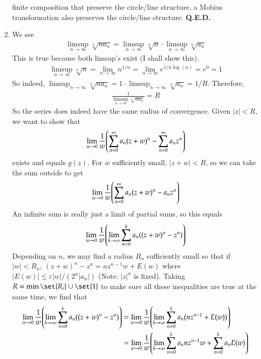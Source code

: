 \documentclass[12pt]{article}
\def \ve{\varepsilon}
\theoremstyle{definition}
\theoremstyle{remark}
\begin{document}
\begin{enumerate}[leftmargin=\labelsep]
finite composition that preserve the circle/line structure, a Mobius transformation also preserves the circle/line structure. \textbf{Q.E.D.}
		
		\item We see
		\begin{align*}
			\limsup_{n \to \infty} \sqrt[n]{na_n} = \limsup_{n \to \infty} \sqrt[n]{n} \cdot \limsup_{n \to \infty} \sqrt[n]{a_n}
		\end{align*}
		This is true because both limsup's exist (I shall show this).
		\begin{align*}
			\limsup_{n \to \infty} \sqrt[n]{n} = \lim_{n \to \infty} n^{1/n} = \lim_{n \to \infty} e^{1/n\log(n)} = e^0 = 1
		\end{align*}
		So indeed, $\limsup_{n \to \infty} \sqrt[n]{na_n} = 1 \cdot \limsup_{n\to\infty} \sqrt[n]{a_n} = 1/R$. Therefore,
		\begin{align*}
			\frac1{\limsup_{n \to \infty} \sqrt[n]{na_n}} = R
		\end{align*}
		So the series does indeed have the same radius of convergence. Given $|z| < R$, we want to show that 
		\begin{align*}
			\lim_{w \to 0} \frac1w \qty(\sum_{n=0}^\infty a_n(z+w)^n - \sum_{n=0}^\infty a_nz^n)
		\end{align*}
		exists and equals $g(z)$. For $w$ sufficiently small, $|z+w| < R$, so we can take the sum outside to get
		\begin{align*}
			\lim_{w \to 0} \frac1w \qty(\sum_{n=0}^\infty a_n(z+w)^n - a_nz^n)
		\end{align*}
		An infinite sum is really just a limit of partial sums, so this equals
		\begin{align*}
			\lim_{w \to 0} \frac1w \qty(\lim_{k \to \infty} \sum_{n=0}^k a_n((z+w)^n - z^n))
		\end{align*}
		Depending on $n$, we may find a radius $R_n$ sufficiently small so that if $|w| < R_n$, $(z+w)^n-z^n = nz^{n-1}w + E(w)$ where $|E(w)| \leq \ve|w|/(2^n|a_n|)$ (Note: $|z|^n$ is fixed). Taking $R = \min \set{R_i} \cup \set{1}$ to make sure all these inequalities are true at the same time, we find that
		\begin{align*}
			\lim_{w \to 0} \frac1w \qty(\lim_{k \to \infty} \sum_{n=0}^k a_n((z+w)^n - z^n)) &= \lim_{w \to 0} \frac1w \qty(\lim_{k \to \infty} \sum_{n=0}^k a_n(nz^{n-1} + E(w))) \\
			&= \lim_{w \to 0} \frac1w \qty(\lim_{k \to \infty} \sum_{n=0}^k a_nnz^{n-1} w + \sum_{n=0}^k a_nE(w))
		\end{align*}

\end{enumerate}
\end{document}
